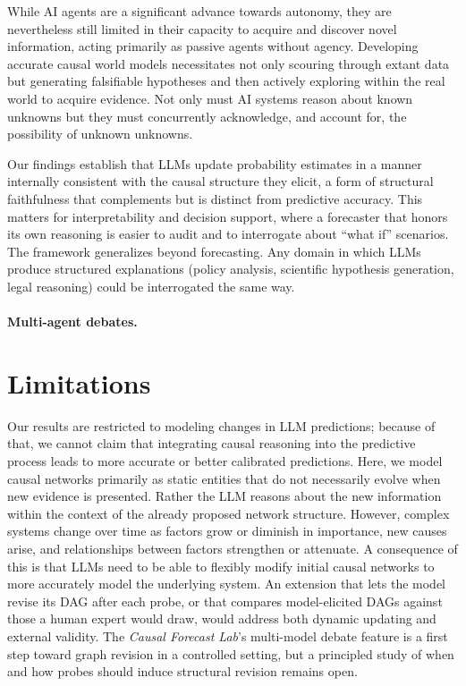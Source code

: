\documentclass[11pt]{article}
\begin{document}
While AI agents are a significant advance towards autonomy, they are nevertheless still limited in their capacity to acquire and discover novel information, acting primarily as passive agents without agency. Developing accurate causal world models necessitates not only scouring through extant data but generating falsifiable hypotheses and then actively exploring within the real world to acquire evidence. Not only must AI systems reason about known unknowns but they must concurrently acknowledge, and account for, the possibility of unknown unknowns.

Our findings establish that LLMs update probability estimates in a manner internally consistent with the causal structure they elicit, a form of structural faithfulness that complements but is distinct from predictive accuracy. This matters for interpretability and decision support, where a forecaster that honors its own reasoning is easier to audit and to interrogate about ``what if'' scenarios. The framework generalizes beyond forecasting. Any domain in which LLMs produce structured explanations (policy analysis, scientific hypothesis generation, legal reasoning) could be interrogated the same way.

\paragraph{Multi-agent debates.} %

\section{Limitations}
\label{sec:limitations}

Our results are restricted to modeling changes in LLM predictions; because of that, we cannot claim that integrating causal reasoning into the predictive process leads to more accurate or better calibrated predictions. Here, we model causal networks primarily as static entities that do not necessarily evolve when new evidence is presented. Rather the LLM reasons about the new information within the context of the already proposed network structure. However, complex systems change over time as factors grow or diminish in importance, new causes arise, and relationships between factors strengthen or attenuate. A consequence of this is that LLMs need to be able to flexibly modify initial causal networks to more accurately model the underlying system. An extension that lets the model revise its DAG after each probe, or that compares model-elicited DAGs against those a human expert would draw, would address both dynamic updating and external validity. The \emph{Causal Forecast Lab}'s multi-model debate feature is a first step toward graph revision in a controlled setting, but a principled study of when and how probes should induce structural revision remains open.
\end{document}
